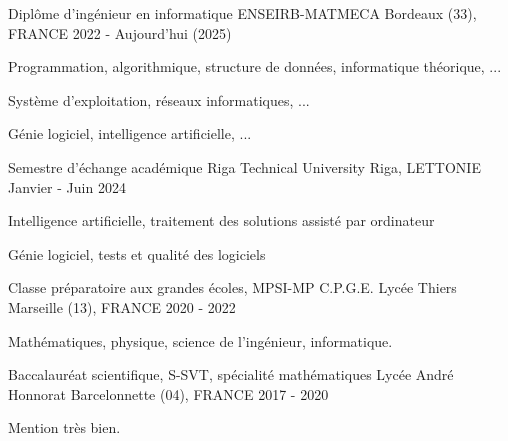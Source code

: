 

\begin{cventries}

  \cventry
    {Diplôme d'ingénieur en informatique} %
    {ENSEIRB-MATMECA} %
    {Bordeaux (33), FRANCE} %
    {2022 - Aujourd'hui (2025)} %
    {
      \begin{cvitems} %
        \item{Programmation, algorithmique, structure de données, informatique théorique, ...}
        \item{Système d'exploitation, réseaux informatiques, ...}
        \item{Génie logiciel, intelligence artificielle, ...}
      \end{cvitems}
    }

  \cventry
    {Semestre d'échange académique} %
    {Riga Technical University} %
    {Riga, LETTONIE} %
    {Janvier - Juin 2024} %
    {
      \begin{cvitems} %
        \item{Intelligence artificielle, traitement des solutions assisté par ordinateur}
        \item{Génie logiciel, tests et qualité des logiciels}
      \end{cvitems}
    }

  \cventry
    {Classe préparatoire aux grandes écoles, MPSI-MP} %
    {C.P.G.E. Lycée Thiers} %
    {Marseille (13), FRANCE} %
    {2020 - 2022} %
    {
      \begin{cvitems} %
        \item{Mathématiques, physique, science de l'ingénieur, informatique.}
      \end{cvitems}
    }

  \cventry
    {Baccalauréat scientifique, S-SVT, spécialité mathématiques} %
    {Lycée André Honnorat} %
    {Barcelonnette (04), FRANCE} %
    {2017 - 2020} %
    {
      \begin{cvitems} %
        \item{Mention très bien.}
      \end{cvitems}
    }


\end{cventries}
